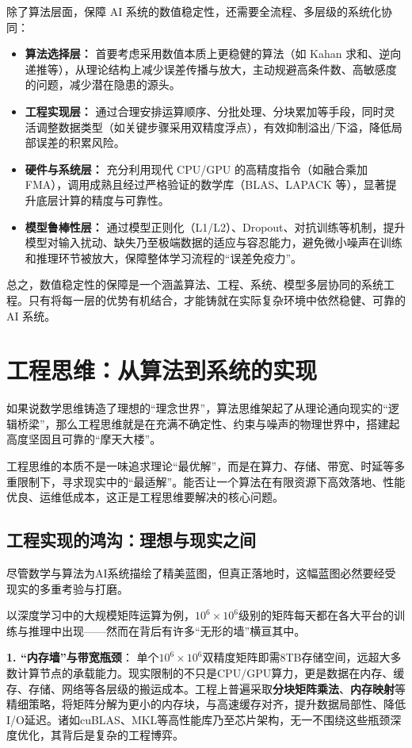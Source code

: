 除了算法层面，保障 AI 系统的数值稳定性，还需要全流程、多层级的系统化协同：

\begin{itemize}
    \item \textbf{算法选择层：} 首要考虑采用数值本质上更稳健的算法（如 Kahan 求和、逆向递推等），从理论结构上减少误差传播与放大，主动规避高条件数、高敏感度的问题，减少潜在隐患的源头。
    \item \textbf{工程实现层：} 通过合理安排运算顺序、分批处理、分块累加等手段，同时灵活调整数据类型（如关键步骤采用双精度浮点），有效抑制溢出/下溢，降低局部误差的积累风险。
    \item \textbf{硬件与系统层：} 充分利用现代 CPU/GPU 的高精度指令（如融合乘加 FMA），调用成熟且经过严格验证的数学库（BLAS、LAPACK 等），显著提升底层计算的精度与可靠性。
    \item \textbf{模型鲁棒性层：} 通过模型正则化（L1/L2）、Dropout、对抗训练等机制，提升模型对输入扰动、缺失乃至极端数据的适应与容忍能力，避免微小噪声在训练和推理环节被放大，保障整体学习流程的“误差免疫力”。
\end{itemize}

总之，数值稳定性的保障是一个涵盖算法、工程、系统、模型多层协同的系统工程。只有将每一层的优势有机结合，才能铸就在实际复杂环境中依然稳健、可靠的 AI 系统。

\section{工程思维：从算法到系统的实现}

如果说数学思维铸造了理想的“理念世界”，算法思维架起了从理论通向现实的“逻辑桥梁”，那么工程思维就是在充满不确定性、约束与噪声的物理世界中，搭建起高度坚固且可靠的“摩天大楼”。

工程思维的本质不是一味追求理论“最优解”，而是在算力、存储、带宽、时延等多重限制下，寻求现实中的“最适解”。能否让一个算法在有限资源下高效落地、性能优良、运维低成本，这正是工程思维要解决的核心问题。

\subsection{工程实现的鸿沟：理想与现实之间}

尽管数学与算法为AI系统描绘了精美蓝图，但真正落地时，这幅蓝图必然要经受现实的多重考验与打磨。

以深度学习中的大规模矩阵运算为例，$10^6\times 10^6$级别的矩阵每天都在各大平台的训练与推理中出现——然而在背后有许多“无形的墙”横亘其中。

\textbf{1. “内存墙”与带宽瓶颈}：
单个$10^6\times 10^6$双精度矩阵即需8TB存储空间，远超大多数计算节点的承载能力。现实限制的不只是CPU/GPU算力，更是数据在内存、缓存、存储、网络等各层级的搬运成本。工程上普遍采取\textbf{分块矩阵乘法}、\textbf{内存映射}等精细策略，将矩阵分解为更小的内存块，与高速缓存对齐，提升数据局部性、降低I/O延迟。诸如cuBLAS、MKL等高性能库乃至芯片架构，无一不围绕这些瓶颈深度优化，其背后是复杂的工程博弈。

